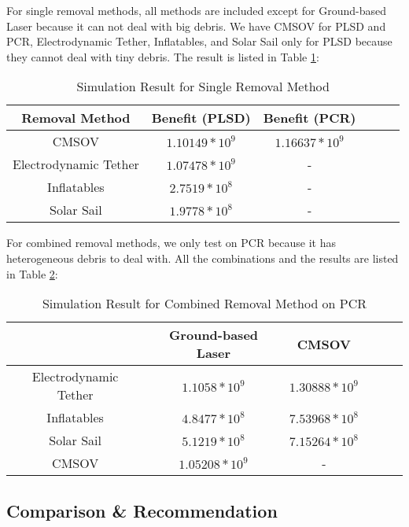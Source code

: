 \documentclass{mcmthesis}
\begin{document}
	For single removal methods, all methods are included except for Ground-based Laser because it can not deal with big debris. We have CMSOV for PLSD and PCR,  Electrodynamic Tether, Inflatables, and Solar Sail only for PLSD because they cannot deal with tiny debris. The result is listed in Table \ref{Tab-ResultSingle}:
	
	\begin{table}[htbp]
		\centering
		\caption{Simulation Result for Single Removal Method}
		\begin{tabular}{cccccc}
			\hline
			Removal Method &  Benefit (PLSD) & Benefit (PCR) \\
			\hline
			\hline
			CMSOV 		        & $1.10149*10^9$ &$1.16637*10^9$\\
			Electrodynamic Tether & $1.07478*10^9$   &-\\
			Inflatables 	        & $2.7519*10^8$   &-\\
			Solar Sail 	                & $1.9778*10^8$   &-\\
			\hline
		\end{tabular}
		\label{Tab-ResultSingle}
	\end{table}
	
	For combined removal methods, we only test on PCR because it has heterogeneous debris to deal with. All the combinations and the results are listed in Table \ref{Tab-ResultCombined}:
	
	
	\begin{table}[htbp]
		\centering
		\caption{Simulation Result for Combined Removal Method on PCR}
		\begin{tabular}{c|ccccc}
			\hline
			&  Ground-based Laser & CMSOV \\
			\hline
			\hline
			Electrodynamic Tether & $1.1058*10^9$ & $1.30888*10^9$\\
			Inflatables 	        &$4.8477*10^8$ &$7.53968*10^8$\\
			Solar Sail 	                & $5.1219*10^8$&$7.15264*10^8$\\
			CMSOV		        & $1.05208*10^9$ &-\\
			\hline
		\end{tabular}
		\label{Tab-ResultCombined}
	\end{table}
	
	
	
	\subsection{Comparison \& Recommendation}
	
\end{document}
